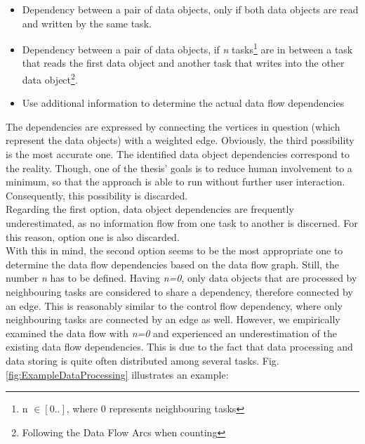 \begin{itemize}
	\item Dependency between a pair of data objects, only if both data objects are read and written by the same task.
	\item Dependency between a pair of data objects, if \textit{n} tasks\footnote{n $\in [0..]$, where 0 represents neighbouring tasks} are in between a task that reads the first data object and another task that writes into the other data object\footnote{Following the Data Flow Arcs when counting}.
	

	
	\item Use additional information to determine the actual data flow dependencies
\end{itemize}
\noindent
The dependencies are expressed by connecting the vertices in question (which represent the data objects) with a weighted edge. 
Obviously, the third possibility is the most accurate one. The identified data object dependencies correspond to the reality. Though, one of the thesis' goals is to reduce human involvement to a minimum, so that the approach is able to run without further user interaction. Consequently, this possibility is discarded. \\
Regarding the first option, data object dependencies are frequently underestimated, as no information flow from one task to another is discerned. For this reason, option one is also discarded. \\
With this in mind, the second option seems to be the most appropriate one to determine the data flow dependencies based on the data flow graph. Still, the number \textit{n} has to be defined. Having \textit{n=0}, only data objects that are processed by neighbouring tasks are considered to share a dependency, therefore connected by an edge. This is reasonably similar to the control flow dependency, where only neighbouring tasks are connected by an edge as well. However, we empirically examined the data flow with \textit{n=0} and experienced an underestimation of the existing data flow dependencies. This is due to the fact that data processing and data storing is quite often distributed among several tasks. Fig.\ref{fig:ExampleDataProcessing} illustrates an example: 


